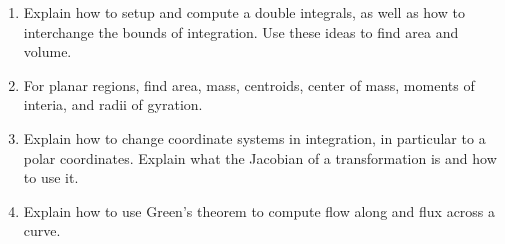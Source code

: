 
\begin{enumerate}
\item Explain how to setup and compute a double integrals, as well as
how to interchange the bounds of integration. Use these ideas to find
area and volume.
\item For planar regions, find area, mass, centroids, center of mass,
moments of interia, and radii of gyration.
\item Explain how to change coordinate systems in integration, in
particular to a polar coordinates. Explain what the Jacobian of a
transformation is and how to use it.
\item Explain how to use Green's theorem to compute flow along and
flux across a curve.
\end{enumerate}

